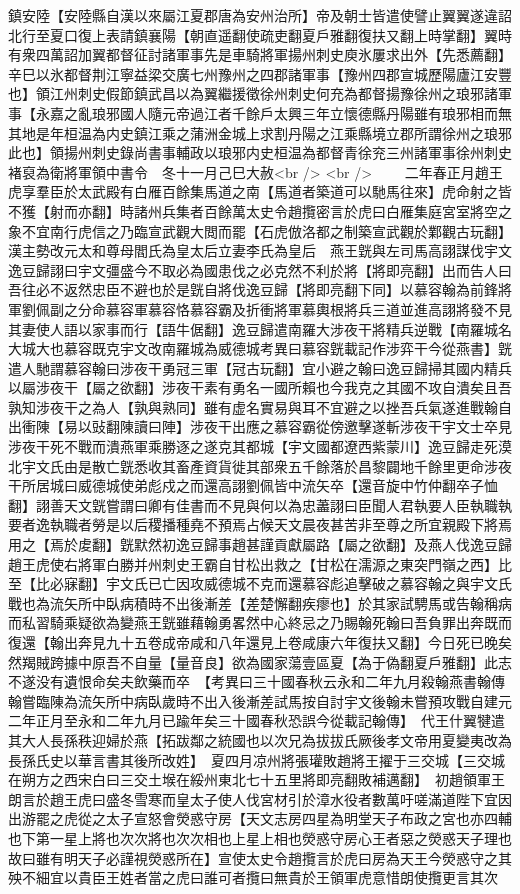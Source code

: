 鎮安陸【安陸縣自漢以來屬江夏郡唐為安州治所】帝及朝士皆遣使譬止翼翼遂違詔北行至夏口復上表請鎮襄陽【朝直遥翻使疏吏翻夏戶雅翻復扶又翻上時掌翻】翼時有衆四萬詔加翼都督征討諸軍事先是車騎將軍揚州刺史庾氷屢求出外【先悉薦翻】辛巳以氷都督荆江寧益梁交廣七州豫州之四郡諸軍事【豫州四郡宣城歷陽廬江安豐也】領江州刺史假節鎮武昌以為翼繼援徵徐州刺史何充為都督揚豫徐州之琅邪諸軍事【永嘉之亂琅邪國人隨元帝過江者千餘戶太興三年立懷德縣丹陽雖有琅邪相而無其地是年桓温為内史鎮江乘之蒲洲金城上求割丹陽之江乘縣境立郡所謂徐州之琅邪此也】領揚州刺史錄尚書事輔政以琅邪内史桓温為都督青徐兖三州諸軍事徐州刺史褚裒為衛將軍領中書令　冬十一月己巳大赦<br />
<br />
　　二年春正月趙王虎享羣臣於太武殿有白雁百餘集馬道之南【馬道者築道可以馳馬往來】虎命射之皆不獲【射而亦翻】時諸州兵集者百餘萬太史令趙攬密言於虎曰白雁集庭宮室將空之象不宜南行虎信之乃臨宣武觀大閲而罷【石虎倣洛都之制築宣武觀於鄴觀古玩翻】　漢主勢改元太和尊母閻氏為皇太后立妻李氏為皇后　燕王皝與左司馬高詡謀伐宇文逸豆歸詡曰宇文彊盛今不取必為國患伐之必克然不利於將【將即亮翻】出而告人曰吾往必不返然忠臣不避也於是皝自將伐逸豆歸【將即亮翻下同】以慕容翰為前鋒將軍劉佩副之分命慕容軍慕容恪慕容霸及折衝將軍慕輿根將兵三道並進高詡將發不見其妻使人語以家事而行【語牛倨翻】逸豆歸遣南羅大涉夜干將精兵逆戰【南羅城名大城大也慕容既克宇文改南羅城為威德城考異曰慕容皝載記作涉弈干今從燕書】皝遣人馳謂慕容翰曰涉夜干勇冠三軍【冠古玩翻】宜小避之翰曰逸豆歸掃其國内精兵以屬涉夜干【屬之欲翻】涉夜干素有勇名一國所賴也今我克之其國不攻自潰矣且吾孰知涉夜干之為人【孰與熟同】雖有虚名實易與耳不宜避之以挫吾兵氣遂進戰翰自出衝陳【易以䜴翻陳讀曰陣】涉夜干出應之慕容霸從傍邀擊遂斬涉夜干宇文士卒見涉夜干死不戰而潰燕軍乘勝逐之遂克其都城【宇文國都遼西紫蒙川】逸豆歸走死漠北宇文氏由是散亡皝悉收其畜產資貨徙其部衆五千餘落於昌黎闢地千餘里更命涉夜干所居城曰威德城使弟彪戍之而還高詡劉佩皆中流矢卒【還音旋中竹仲翻卒子恤翻】詡善天文皝嘗謂曰卿有佳書而不見與何以為忠藎詡曰臣聞人君執要人臣執職執要者逸執職者勞是以后稷播種堯不預焉占候天文晨夜甚苦非至尊之所宜親殿下將焉用之【焉於䖍翻】皝默然初逸豆歸事趙甚謹貢獻屬路【屬之欲翻】及燕人伐逸豆歸趙王虎使右將軍白勝并州刺史王霸自甘松出救之【甘松在濡源之東突門嶺之西】比至【比必寐翻】宇文氏已亡因攻威德城不克而還慕容彪追擊破之慕容翰之與宇文氏戰也為流矢所中臥病積時不出後漸差【差楚懈翻疾瘳也】於其家試騁馬或告翰稱病而私習騎乘疑欲為變燕王皝雖藉翰勇畧然中心終忌之乃賜翰死翰曰吾負罪出奔既而復還【翰出奔見九十五卷成帝咸和八年還見上卷咸康六年復扶又翻】今日死已晚矣然羯賊跨據中原吾不自量【量音良】欲為國家蕩壹區夏【為于偽翻夏戶雅翻】此志不遂没有遺恨命矣夫飲藥而卒　【考異曰三十國春秋云永和二年九月殺翰燕書翰傳翰嘗臨陳為流矢所中病臥歲時不出入後漸差試馬按自討宇文後翰未嘗預攻戰自建元二年正月至永和二年九月已踰年矣三十國春秋恐誤今從載記翰傳】　代王什翼犍遣其大人長孫秩迎婦於燕【拓跋鄰之統國也以次兄為拔拔氏厥後孝文帝用夏變夷改為長孫氏史以華言書其後所改姓】　夏四月凉州將張瓘敗趙將王擢于三交城【三交城在朔方之西宋白曰三交土堠在綏州東北七十五里將即亮翻敗補邁翻】　初趙領軍王朗言於趙王虎曰盛冬雪寒而皇太子使人伐宮材引於漳水役者數萬吁嗟滿道陛下宜因出游罷之虎從之太子宣怒會熒惑守房【天文志房四星為明堂天子布政之宮也亦四輔也下第一星上將也次次將也次次相也上星上相也熒惑守房心王者惡之熒惑天子理也故曰雖有明天子必謹視熒惑所在】宣使太史令趙攬言於虎曰房為天王今熒惑守之其殃不細宜以貴臣王姓者當之虎曰誰可者攬曰無貴於王領軍虎意惜朗使攬更言其次